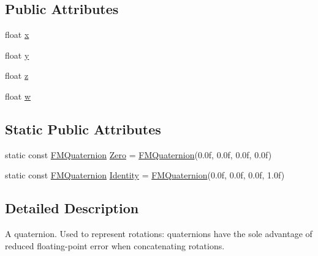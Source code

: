 \subsection*{Public Attributes}
\begin{DoxyCompactItemize}
\item 
float \hyperlink{classFMQuaternion_a036c642a43fb84dc5544eb4ce0e0828d}{x}
\item 
float \hyperlink{classFMQuaternion_a996bf6bcb013dbbbe8e255c35e085f81}{y}
\item 
float \hyperlink{classFMQuaternion_a03d06578ec64cf8a4d2032c336153244}{z}
\item 
float \hyperlink{classFMQuaternion_ac60123167417258df35a27db4d3e7646}{w}
\end{DoxyCompactItemize}
\subsection*{Static Public Attributes}
\begin{DoxyCompactItemize}
\item 
static const \hyperlink{classFMQuaternion}{FMQuaternion} \hyperlink{classFMQuaternion_a5607b2bda36fbfff32f3a1677e1ebebc}{Zero} = \hyperlink{classFMQuaternion}{FMQuaternion}(0.0f, 0.0f, 0.0f, 0.0f)
\item 
static const \hyperlink{classFMQuaternion}{FMQuaternion} \hyperlink{classFMQuaternion_a7dccc8f53d6f730b27f784416a53052b}{Identity} = \hyperlink{classFMQuaternion}{FMQuaternion}(0.0f, 0.0f, 0.0f, 1.0f)
\end{DoxyCompactItemize}


\subsection{Detailed Description}
A quaternion. Used to represent rotations: quaternions have the sole advantage of reduced floating-\/point error when concatenating rotations. 

